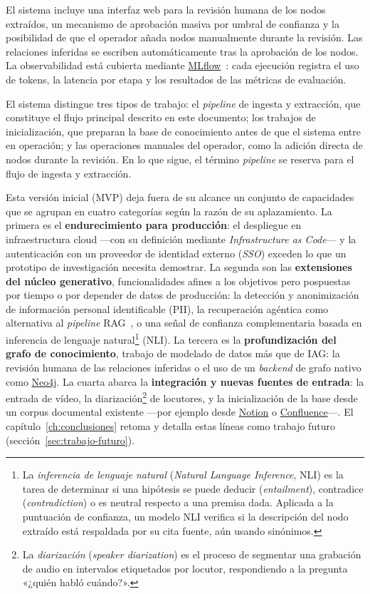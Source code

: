 El sistema incluye una interfaz web para la revisión humana de los nodos extraídos, un
mecanismo de aprobación masiva por umbral de confianza y la posibilidad de que el operador
añada nodos manualmente durante la revisión. Las relaciones inferidas se escriben
automáticamente tras la aprobación de los nodos. La observabilidad está cubierta mediante
\href{https://mlflow.org}{MLflow}~\cite{zaharia2018mlflow}: cada ejecución registra el uso
de tokens, la latencia por etapa y los resultados de las métricas de evaluación.

El sistema distingue tres tipos de trabajo: el \textit{pipeline} de ingesta y extracción, que
constituye el flujo principal descrito en este documento; los trabajos de inicialización, que
preparan la base de conocimiento antes de que el sistema entre en operación; y las operaciones
manuales del operador, como la adición directa de nodos durante la revisión. En lo que sigue,
el término \textit{pipeline} se reserva para el flujo de ingesta y extracción.

\bigskip
\noindent Esta versión inicial (\ac{MVP}) deja fuera de su alcance un conjunto de capacidades
que se agrupan en cuatro categorías según la razón de su aplazamiento. La primera es el
\textbf{endurecimiento para producción}: el despliegue en infraestructura cloud —con su definición
mediante \textit{Infrastructure as Code}— y la autenticación con un proveedor de identidad externo
(\textit{SSO}) exceden lo que un prototipo de investigación necesita demostrar. La segunda son las
\textbf{extensiones del núcleo generativo}, funcionalidades afines a los objetivos pero pospuestas
por tiempo o por depender de datos de producción: la detección y anonimización de información
personal identificable (PII), la recuperación agéntica como alternativa al \textit{pipeline}
\ac{RAG}~\cite{yao2023react}, o una señal de confianza complementaria basada en inferencia de
lenguaje natural\footnote{%
  La \textit{inferencia de lenguaje natural} (\textit{Natural Language Inference}, NLI) es la tarea
  de determinar si una hipótesis se puede deducir (\textit{entailment}), contradice
  (\textit{contradiction}) o es neutral respecto a una premisa dada. Aplicada a la puntuación de
  confianza, un modelo NLI verifica si la descripción del nodo extraído está respaldada por su cita
  fuente, aún usando sinónimos.%
} (\acs{NLI}). La tercera es la \textbf{profundización del grafo de conocimiento}, trabajo de
modelado de datos más que de \ac{IAG}: la revisión humana de las relaciones inferidas o el uso de un
\textit{backend} de grafo nativo como \href{https://neo4j.com}{Neo4j}. La cuarta abarca la
\textbf{integración y nuevas fuentes de entrada}: la entrada de vídeo, la
diarización\footnote{%
  La \textit{diarización} (\textit{speaker diarization}) es el proceso de segmentar una grabación
  de audio en intervalos etiquetados por locutor, respondiendo a la pregunta «¿quién habló
  cuándo?».%
} de locutores, y la inicialización de la base desde un corpus documental existente —por ejemplo
desde \href{https://www.notion.so}{Notion} o \href{https://www.atlassian.com/software/confluence}{Confluence}—.
El capítulo~\ref{ch:conclusiones} retoma y detalla estas líneas como trabajo futuro
(sección~\ref{sec:trabajo-futuro}).
